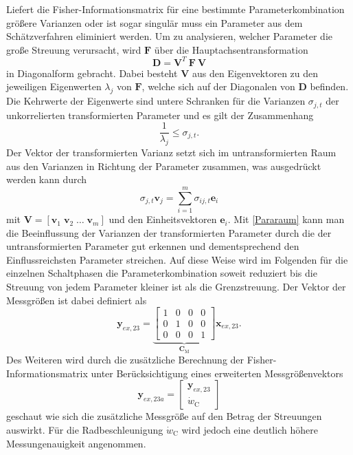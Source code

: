 Liefert die Fisher-Informationsmatrix für eine bestimmte Parameterkombination   größere Varianzen oder ist sogar singulär muss ein Parameter aus dem Schätzverfahren eliminiert werden. Um zu analysieren, welcher Parameter die große Streuung verursacht, wird $\pmb{F}$ über die Hauptachsentransformation
\begin{equation}
\pmb{D} = \pmb{V}^T\ \pmb{F}\ \pmb{V}
\end{equation} 
in Diagonalform gebracht. Dabei besteht $\pmb{V}$ aus den Eigenvektoren zu den jeweiligen Eigenwerten $\lambda_j$ von $\pmb{F}$, welche sich auf der Diagonalen von $\pmb{D}$ befinden. Die Kehrwerte der Eigenwerte sind untere Schranken für die  Varianzen $\sigma_{j,t}$ der unkorrelierten transformierten Parameter und es gilt der Zusammenhang
\begin{equation}
\frac{1}{\lambda_j}\leq \sigma_{j,t}.
\end{equation}
Der Vektor der transformierten Varianz setzt sich im untransformierten Raum aus den Varianzen in Richtung der Parameter zusammen, was ausgedrückt werden kann durch
\begin{equation}\label{Pararaum}
\sigma_{j,t} \pmb{v}_j = \sum_{i=1}^m \sigma_{ij,t} \pmb{e}_i
\end{equation}
mit $\pmb{V} = [\pmb{v}_1\; \pmb{v}_2\; \dots \;\pmb{v}_m]$ und den Einheitsvektoren $\pmb{e}_i$. Mit \eqref{Pararaum} kann man die Beeinflussung der Varianzen der transformierten Parameter durch die der untransformierten Parameter gut erkennen und dementsprechend den Einflussreichsten Parameter streichen. Auf diese Weise wird im Folgenden für die einzelnen Schaltphasen die Parameterkombination soweit reduziert bis die Streuung von jedem Parameter kleiner ist als die Grenzstreuung.
Der Vektor der Messgrößen ist dabei definiert als
\begin{equation}
\pmb{y}_{ex,23} = \underbrace{\begin{bmatrix} 1 & 0 & 0 & 0\\ 0 & 1 & 0 & 0\\ 0 & 0 & 0 & 1\end{bmatrix}}_{\pmb{C}_\mathrm{M}} \pmb{x}_{ex,23}.
\end{equation} 
Des Weiteren wird durch die zusätzliche Berechnung der Fisher-Informationsmatrix unter Berücksichtigung eines erweiterten Messgrößenvektors
\begin{equation}
\pmb{y}_{ex,23a} = \begin{bmatrix} \pmb{y}_{ex,23} \\ \dot{w}_\mathrm{C} \end{bmatrix}
\end{equation}
geschaut wie sich die zusätzliche Messgröße auf den Betrag der Streuungen auswirkt. Für die Radbeschleunigung $\dot{w}_\mathrm{C}$ wird jedoch eine deutlich höhere Messungenauigkeit angenommen.
